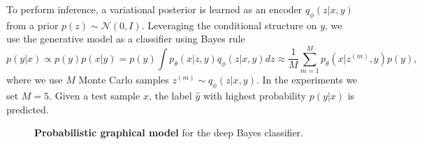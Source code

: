 To perform inference, a variational posterior is learned as an encoder $q_\phi(z|x,y)$ from a prior $p(z) \sim \mathcal{N}(0, I)$.
Leveraging the conditional structure on $y$, we use the generative model as a classifier using Bayes rule
\begin{equation}\label{eq:mc_cvae}
p(y|x) \propto p(y)p(x|y) = p(y) \int p_\theta(x|z,y)q_\phi(z|x,y)dz  \approx  \frac{1}{M} \sum_{m=1}^M p_\theta (x | z^{(m)}, y)p(y), 
\end{equation}
where we use $M$ Monte Carlo samples $z^{(m)} \sim q_\phi(z|x,y)$. In the experiments we set $M = 5$. Given a test sample $x$, the label $\hat{y}$ with highest probability $p(y|x)$ is predicted.
\begin{figure}[ht]
  \begin{center}
\end{center}
  \caption{{\bf Probabilistic graphical model} for the deep Bayes classifier.}\label{fig:deep_bayes}
\end{figure}

